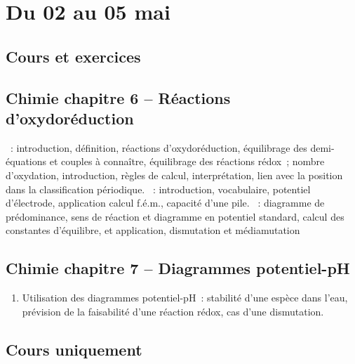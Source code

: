 \documentclass[a4paper, 10pt, final, garamond]{book}
\begin{document}
\setcounter{chapter}{24}

\chapter{Du 02 au 05 mai}

\section{Cours et exercices}
\section*{Chimie chapitre 6 -- Réactions d'oxydoréduction}
\begin{enumerate}[label=\Roman*]
    ~: introduction, définition, réactions
        d'oxydoréduction, équilibrage des demi-équations et couples à connaître,
        équilibrage des réactions rédox~; nombre d'oxydation, introduction,
        règles de calcul, interprétation, lien avec la position dans la
        classification périodique.
    ~: introduction, vocabulaire, potentiel d'électrode, application
        calcul f.é.m., capacité d'une pile.
    ~: diagramme de prédominance, sens de
        réaction et diagramme en potentiel standard, calcul des constantes
        d'équilibre, et application, dismutation et médiamutation
\end{enumerate}

\section*{Chimie chapitre 7 -- Diagrammes potentiel-pH}
\begin{enumerate}[label=\Roman*]
    ~: potentiel standard apparent,
    convention de tracé, existence d'un précipité.
    ~: tracé.
    ~: introduction, attribution, frontières
    horizontales, verticales et droites frontières + bilan.
    \item{Utilisation des diagrammes potentiel-pH}~: stabilité d'une espèce dans
      l'eau, prévision de la faisabilité d'une réaction rédox, cas d'une
      dismutation.
\end{enumerate}

\section{Cours uniquement}
\end{document}
